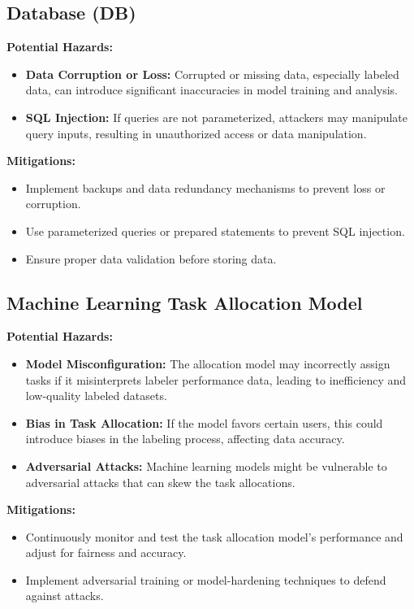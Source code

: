 \documentclass{article}
\begin{document}
\subsection{Database (DB)}
\textbf{Potential Hazards:}
\begin{itemize}
    \item \textbf{Data Corruption or Loss:} Corrupted or missing data, especially labeled data, can introduce significant inaccuracies in model training and analysis.
    \item \textbf{SQL Injection:} If queries are not parameterized, attackers may manipulate query inputs, resulting in unauthorized access or data manipulation.
\end{itemize}
\textbf{Mitigations:}
\begin{itemize}
    \item Implement backups and data redundancy mechanisms to prevent loss or corruption.
    \item Use parameterized queries or prepared statements to prevent SQL injection.
    \item Ensure proper data validation before storing data.
\end{itemize}

\subsection{Machine Learning Task Allocation Model}
\textbf{Potential Hazards:}
\begin{itemize}
    \item \textbf{Model Misconfiguration:} The allocation model may incorrectly assign tasks if it misinterprets labeler performance data, leading to inefficiency and low-quality labeled datasets.
    \item \textbf{Bias in Task Allocation:} If the model favors certain users, this could introduce biases in the labeling process, affecting data accuracy.
    \item \textbf{Adversarial Attacks:} Machine learning models might be vulnerable to adversarial attacks that can skew the task allocations.
\end{itemize}
\textbf{Mitigations:}
\begin{itemize}
    \item Continuously monitor and test the task allocation model’s performance and adjust for fairness and accuracy.
    \item Implement adversarial training or model-hardening techniques to defend against attacks.
\end{itemize}
\end{document}
